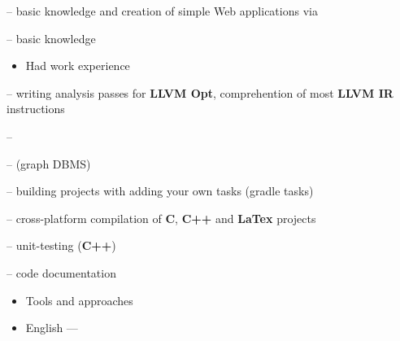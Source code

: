 \documentclass[10pt,a4paper,ragged2e,withhyper]{custom-altacv}
\begin{document}
\begin{paracol}{2}
 -- basic knowledge and creation of simple Web applications via 

 -- basic knowledge
\vspace{.5ex}

\divider

\begin{itemize}
	\item \textcolor{emphasis}{Had work experience} 
\end{itemize}

 -- writing analysis passes for \textbf{LLVM Opt}, comprehention of most \textbf{LLVM IR} instructions
\vspace{1ex}

 -- 
\vspace{-.2ex}

 --  (graph DBMS)
\vspace{1ex}

 -- building projects with adding your own tasks (gradle tasks)
\vspace{1ex}

 -- cross-platform compilation of \textbf{C}, \textbf{C++} and \textbf{LaTex} projects
\vspace{1ex}

 -- unit-testing (\textbf{C++})
\vspace{1ex}

 -- code documentation
\vspace{1ex}

\vspace{1ex}

\divider

\begin{itemize}
	\item\textcolor{emphasis}{Tools and approaches}
\end{itemize}





\begin{itemize}
	\item English --- 
\end{itemize}

\end{paracol}
\end{document}
